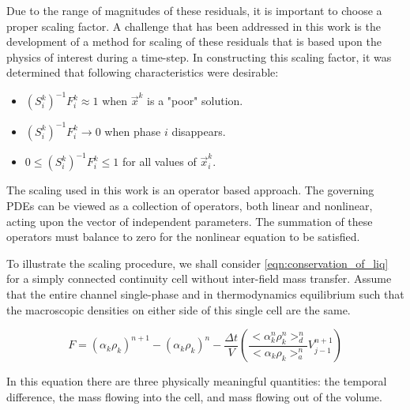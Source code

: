 Due to the range of magnitudes of these residuals, it is important to choose a proper scaling factor.
A challenge that has been addressed in this work is the development of a method for scaling of these residuals that is based upon the physics of interest during a time-step.
In constructing this scaling factor, it was determined that following characteristics were desirable:
\begin{itemize}
\item{$(S_{i}^{k})^{-1} F^{k}_i \approx 1$ when $\vec{x}^{k}$ is a "poor" solution.}
\item{$(S_{i}^{k})^{-1} F^{k}_i \rightarrow 0$ when phase $i$ disappears.}
\item{$0 \leq (S_{i}^{k})^{-1} F^{k}_{i} \leq 1 $ for all values of $\vec{x}^{k}_i$.}
\end{itemize}

The scaling used in this work is an operator based approach.
The governing PDEs can be viewed as a collection of operators, both linear and nonlinear, acting upon the vector of independent parameters.
The summation of these operators must balance to zero for the nonlinear equation to be satisfied.

To illustrate the scaling procedure, we shall consider \eqref{eqn:conservation_of_liq} for a simply connected continuity cell without inter-field mass transfer.
Assume that the entire channel single-phase and in thermodynamics equilibrium such that the macroscopic densities on either side of this single cell are the same.

\begin{equation}
F = \left(\alpha_k \rho_k\right)^{n+1} - \left( \alpha_k \rho_k \right)^n - \frac{\Delta t}{V} \left( \frac{<\alpha^{n}_k \rho^{n}_k>^{n}_{d} }{<\alpha_k \rho_k>^{n}_{a}} V^{n+1}_{j-1} \right)
\end{equation}

In this equation there are three physically meaningful quantities: the temporal difference, the mass flowing into the cell, and mass flowing out of the volume. 

